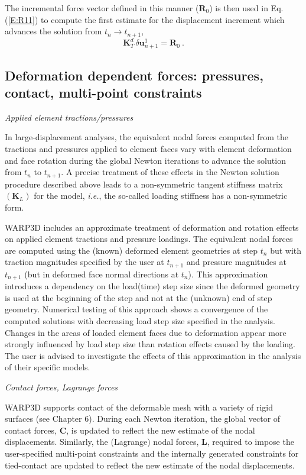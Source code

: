 \documentclass[11pt]{report}
\numberwithin{equation}{section}
\newcommand{\bmf } {\boldsymbol }  %
\newcommand{\ie}{\emph{i.e.},\xspace}
\newcommand{\ti}{\emph}
\begin{document}
The incremental force vector defined in this manner ($\bm{R}_0$) is then used in Eq. (\ref{E:R11}) to compute 
the first estimate for the displacement increment which advances the solution from  $t_n \rightarrow t_{n+1}$,
%
\begin{equation}\label{E:S5}
\mathbf{K}_T^d \, \delta\bm{u}_{n+1}^1= \bm{R}_0 \ .
\end{equation}
%

\subsection{Deformation dependent forces: pressures, contact, multi-point constraints}
\noindent \ti{Applied element tractions/pressures}

\noindent In large-displacement analyses, the equivalent nodal forces computed from the tractions and pressures applied 
to element faces vary with element deformation and face rotation during the global
Newton iterations to advance the solution from $t_n$ to $t_{n+1}$. A precise treatment of these 
effects in the Newton solution procedure described above leads to a non-symmetric 
tangent stiffness matrix $(\bm{K}_L)$ for the model, \ie the so-called loading stiffness 
has a non-symmetric form.

WARP3D includes an approximate treatment of deformation and rotation effects on applied 
element tractions and pressure loadings. The equivalent nodal forces are computed
using the (known) deformed element geometries at step $t_n$ but with traction magnitudes 
specified by the user at $t_{n+1}$
and pressure magnitudes at $t_{n+1}$ (but in deformed face normal directions at $t_n$). 
This approximation introduces a dependency on the load(time) step size since the 
deformed geometry is used at the beginning of the step and not at the (unknown) 
end of step geometry. 
Numerical testing of this approach shows a convergence of the computed solutions with decreasing load step size specified in the analysis. Changes in the areas of loaded element faces due to deformation appear more strongly influenced by load step size than rotation effects caused by the loading. The user is advised to investigate the effects of this approximation in the analysis of their specific models.

\noindent \ti{Contact forces, Lagrange forces}

\noindent WARP3D supports contact of the deformable mesh with a variety of rigid surfaces (see Chapter 6). 
During each Newton iteration, the global vector of contact forces, $\bmf{C}$, is updated to reflect the new estimate
of the nodal displacements. Similarly, the (Lagrange) nodal forces, $\bmf{L}$, required to impose the user-specified
multi-point constraints and the internally generated constraints for tied-contact are updated to reflect the new estimate
of the nodal displacements.
\end{document}
